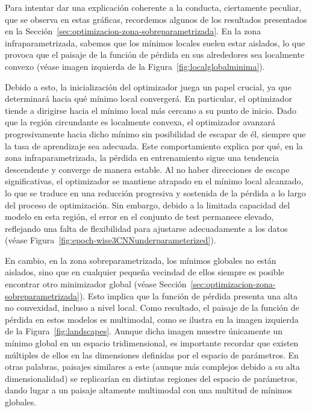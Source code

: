 Para intentar dar una explicación coherente a la conducta, ciertamente peculiar, que se observa en estas gráficas, recordemos algunos de los resultados presentados en la Sección~\ref{sec:optimizacion-zona-sobreparametrizada}. En la zona infraparametrizada, sabemos que los mínimos locales suelen estar aislados, lo que provoca que el paisaje de la función de pérdida en sus alrededores sea localmente convexo (véase imagen izquierda de la Figura~\ref{fig:localglobalminima}).\newline

Debido a esto, la inicialización del optimizador juega un papel crucial, ya que determinará hacia qué mínimo local convergerá. En particular, el optimizador tiende a dirigirse hacia el mínimo local más cercano a su punto de inicio. Dado que la región circundante es localmente convexa, el optimizador avanzará progresivamente hacia dicho mínimo sin posibilidad de escapar de él, siempre que la tasa de aprendizaje sea adecuada. Este comportamiento explica por qué, en la zona infraparametrizada, la pérdida en entrenamiento sigue una tendencia descendente y converge de manera estable. Al no haber direcciones de escape significativas, el optimizador se mantiene atrapado en el mínimo local alcanzado, lo que se traduce en una reducción progresiva y sostenida de la pérdida a lo largo del proceso de optimización. Sin embargo, debido a la limitada capacidad del modelo en esta región, el error en el conjunto de test permanece elevado, reflejando una falta de flexibilidad para ajustarse adecuadamente a los datos (véase Figura~\ref{fig:epoch-wise3CNNunderparameterized}).\newline

En cambio, en la zona sobreparametrizada, los mínimos globales no están aislados, sino que en cualquier pequeña vecindad de ellos siempre es posible encontrar otro minimizador global (véase Sección~\ref{sec:optimizacion-zona-sobreparametrizada}). Esto implica que la función de pérdida presenta una alta no convexidad, incluso a nivel local. Como resultado, el paisaje de la función de pérdida en estos modelos es multimodal, como se ilustra en la imagen izquierda de la Figura~\ref{fig:landscapes}. Aunque dicha imagen muestre únicamente un mínimo global en un espacio tridimensional, es importante recordar que existen múltiples de ellos en las dimensiones definidas por el espacio de parámetros. En otras palabras, paisajes similares a este (aunque más complejos debido a su alta dimensionalidad) se replicarían en distintas regiones del espacio de parámetros, dando lugar a un paisaje altamente multimodal con una multitud de mínimos globales.\newline 

